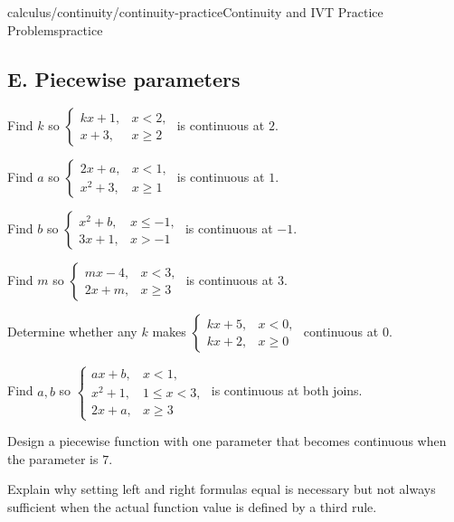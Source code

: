 \begin{webpage}{calculus/continuity/continuity-practice}{Continuity and IVT Practice Problems}{practice}
\subsection*{E. Piecewise parameters}
\begin{bgexercises}[label=\textbf{5.\arabic*},resume]
  \item Find \(k\) so \(\begin{cases}kx+1,&x<2,\\x+3,&x\ge2\end{cases}\) is continuous at \(2\).
  \item Find \(a\) so \(\begin{cases}2x+a,&x<1,\\x^2+3,&x\ge1\end{cases}\) is continuous at \(1\).
  \item Find \(b\) so \(\begin{cases}x^2+b,&x\le-1,\\3x+1,&x>-1\end{cases}\) is continuous at \(-1\).
  \item Find \(m\) so \(\begin{cases}mx-4,&x<3,\\2x+m,&x\ge3\end{cases}\) is continuous at \(3\).
  \item Determine whether any \(k\) makes \(\begin{cases}kx+5,&x<0,\\kx+2,&x\ge0\end{cases}\) continuous at \(0\).
  \item Find \(a,b\) so \(\begin{cases}ax+b,&x<1,\\x^2+1,&1\le x<3,\\2x+a,&x\ge3\end{cases}\) is continuous at both joins.
  \item Design a piecewise function with one parameter that becomes continuous when the parameter is \(7\).
  \item Explain why setting left and right formulas equal is necessary but not always sufficient when the actual function value is defined by a third rule.
\end{bgexercises}


\end{webpage}

